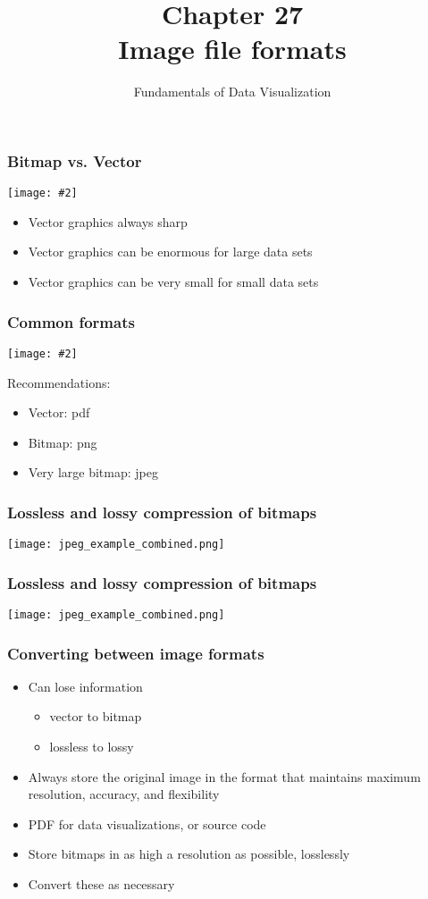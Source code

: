 \documentclass{beamer}
\author{Fundamentals of Data Visualization}
\title{Chapter 27\\Image file formats}
\newcommand{\bi}{\begin{itemize}}
\newcommand{\li}{\item}
\newcommand{\ei}{\end{itemize}}
\newcommand{\fig}[2]{\centerline{\texttt{[image: \#2]}}}
\newcommand{\bfr}[1]{\begin{frame}[fragile]\frametitle{{ #1 }}}
\begin{document}
\begin{frame}
\maketitle
\end{frame}

\bfr{Bitmap vs. Vector}
\fig{1.1}{bitmap-zoom-1}
\bi
\li Vector graphics always sharp
\li Vector graphics can be enormous for large data sets
\li Vector graphics can be very small for small data sets
\ei
\end{frame}

\bfr{Common formats}
\fig{1.1}{formattable}
Recommendations:
\bi
\li Vector: pdf
\li Bitmap: png
\li Very large bitmap: jpeg
\ei
\end{frame}


\bfr{Lossless and lossy compression of bitmaps}

\centerline{\texttt{[image: jpeg\_example\_combined.png]}}
\end{frame}

\bfr{Lossless and lossy compression of bitmaps}

\centerline{\texttt{[image: jpeg\_example\_combined.png]}}
\end{frame}

\bfr{Converting between image formats}
\bi
\li Can lose information
\bi
\li vector to bitmap
\li lossless to lossy
\ei
\li Always store the original image in the format that maintains maximum resolution, accuracy, and flexibility
\li PDF for data visualizations, or source code
\li Store bitmaps in as high a resolution as possible, losslessly
\li Convert these as necessary
\ei
\end{frame}
\end{document}
